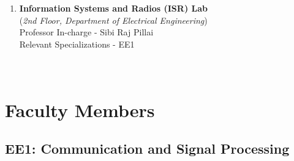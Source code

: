 \documentclass[openany]{book} %
\begin{document}
\begin{enumerate}
\item \textbf{Information Systems and Radios (ISR) Lab}\\
    (\textit{2nd Floor, Department of Electrical Engineering})\\
    Professor In-charge - Sibi Raj Pillai\\
Relevant Specializations - EE1\\
\\
\\
\end{enumerate}
   

\chapter{Faculty Members}
\section{EE1: Communication and Signal Processing}
\end{document}
